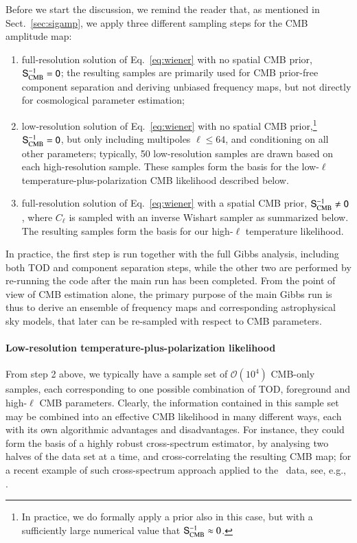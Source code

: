 \documentclass[onecolumn]{aa}
\renewcommand{\S}[0]{\tens{S}}
\begin{document}
Before we start the discussion, we remind the reader that, as
mentioned in Sect.~\ref{sec:sigamp}, we apply three different
sampling steps for the CMB amplitude map:
\begin{enumerate}
\item full-resolution solution of Eq.~\eqref{eq:wiener} with no
  spatial CMB prior, $\S_{\mathrm{CMB}}^{-1} = \tens 0$; the resulting
  samples are primarily used for CMB prior-free component separation
  and deriving unbiased frequency maps, but not directly for
  cosmological parameter estimation;
\item low-resolution solution of Eq.~\eqref{eq:wiener} with no spatial
  CMB prior,\footnote{In practice, we do formally apply a prior also
    in this case, but with a sufficiently large numerical value that
    $\S_{\mathrm{CMB}}^{-1}\approx0$.} $\S_{\mathrm{CMB}}^{-1} = \tens
  0$, but only including multipoles ${\ell \le 64}$, and conditioning
  on all other parameters; typically, 50 low-resolution samples are
  drawn based on each high-resolution sample. These samples form the
  basis for the low-$\ell$ temperature-plus-polarization CMB
  likelihood described below.
\item full-resolution solution of Eq.~\eqref{eq:wiener} with a spatial
  CMB prior, $\S_{\mathrm{CMB}}^{-1} \ne \tens 0$, where $C_{\ell}$ is
  sampled with an inverse Wishart sampler as summarized below. The
  resulting samples form the basis for our high-$\ell$ temperature
  likelihood.
\end{enumerate}
In practice, the first step is run together with the full Gibbs
analysis, including both TOD and component separation steps, while the
other two are performed by re-running the code after the main run has
been completed. From the point of view of CMB estimation alone, the
primary purpose of the main Gibbs run is thus to derive an ensemble of
frequency maps and corresponding astrophysical sky models, that later
can be re-sampled with respect to CMB parameters.

\paragraph{Low-resolution temperature-plus-polarization likelihood}
From step 2 above, we typically have a sample set of
$\mathcal{O}(10^4)$ CMB-only samples, each corresponding to one
possible combination of TOD, foreground and high-$\ell$ CMB
parameters. Clearly, the information contained in this sample set may
be combined into an effective CMB likelihood in many different ways,
each with its own algorithmic advantages and disadvantages. For
instance, they could form the basis of a highly robust cross-spectrum
estimator, by analysing two halves of the data set at a time, and
cross-correlating the resulting CMB map; for a recent example of such
cross-spectrum approach applied to the \Planck\ data, see, e.g.,
\citet{planck2016-l05}.
\end{document}
